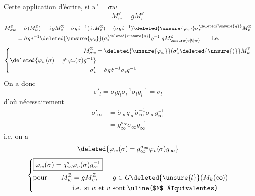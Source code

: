 Cette application  d'écrire, si $w'=\sigma w$
\[
M_w^{\mathbb Z}=gM_v^{\mathbb Z}
\]
\[
\begin{aligned}
M_{\sigma w}^{\mathbb Z}&=\dot{\sigma}(M_w^{\mathbb Z})=\dot{\sigma}gM_v^{\mathbb Z}
=\dot{\sigma}g\dot{\sigma}^{-1}(\dot{\sigma}.M_v^{\mathbb Z})
=(\dot{\sigma}g\dot{\sigma}^{-1})\deleted{\unsure{\varphi_v}}\sigma_*^{\deleted{\unsure{g}}}M_v^{\mathbb Z}\\
&=\dot{\sigma}g\dot{\sigma}^{-1}\deleted{\unsure{\varphi_v}}(\sigma_*^{\deleted{\unsure{g}}}g^{-1}\ gM_{\unsure{v|k|w}}^{\mathbb Z}\qquad\text{i.e.}
\end{aligned}
\]
\[
\left\{\begin{aligned}
M_{\sigma w}^{\mathbb Z}&=\deleted{\unsure{\varphi_w}}(\sigma'_* \deleted{\unsure{)}}M_w^{\mathbb Z}\\
\deleted{\varphi_w(\sigma)=g^{\dot{\sigma}}\varphi_v(\sigma)g^{-1}}&\\
\sigma'_*&=\dot{\sigma}g\dot{\sigma}^{-1}\sigma_*g^{-1}
\end{aligned}\right.
\]
On a donc 
\[
\sigma'_l=\sigma_l g_l\sigma_l^{-1}\sigma_l g_l^{-1}=\sigma_l
\]
d'où nécessairement
\[
\begin{aligned}
\sigma'_\infty&=\dot{\sigma}_\infty g_\infty\dot{\sigma}_\infty^{-1}\sigma_\infty g_\infty^{-1}\\
&=g_\infty^{\dot{\sigma}_\infty}\sigma_\infty g_\infty^{-1}
\end{aligned}
\]
i.e. on a
\[
\deleted{\varphi_w(\sigma)=g_\infty^{\dot{\sigma}_\infty}\varphi_v(\sigma)g_\infty}
\]
\[
\left\{\begin{aligned}
&\boxed{\varphi_w(\sigma)=g_\infty^{\sigma}\varphi_v(\sigma)g_\infty^{-1}}\\
&\text{pour}\qquad M_w^{\mathbb Z}=gM_v^{\mathbb Z},\qquad g\in G\deleted{\unsure{l}}(M_k(\infty))\\
&\hspace{2cm}\text{i.e. si }w\text{ et }v\text{ sont }\text{\uline{$M$-équivalentes}}
\end{aligned}\right.
\]

